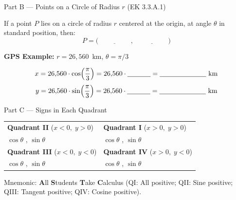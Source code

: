 \documentclass[10pt]{article}
\begin{document}
\vspace{0.08in}

\begin{notesbox}{Part B --- Points on a Circle of Radius $r$ (EK 3.3.A.1)}

If a point $P$ lies on a circle of radius $r$ centered at the origin, at angle $\theta$ in standard position, then:
\[
  P = \bigl(\underline{\hspace{2cm}},\; \underline{\hspace{2cm}}\bigr)
\]

\vspace{0.08in}
\textbf{GPS Example:} $r = 26{,}560$~km, $\theta = \pi/3$

\[
  x = 26{,}560 \cdot \cos\!\left(\frac{\pi}{3}\right) = 26{,}560 \cdot \underline{\hspace{1.2cm}} = \underline{\hspace{2.4cm}} \text{ km}
\]
\[
  y = 26{,}560 \cdot \sin\!\left(\frac{\pi}{3}\right) = 26{,}560 \cdot \underline{\hspace{1.2cm}} = \underline{\hspace{2.4cm}} \text{ km}
\]

\end{notesbox}

\vspace{0.08in}

\begin{notesbox}{Part C --- Signs in Each Quadrant}

\renewcommand{\arraystretch}{1.8}
\begin{tabularx}{\linewidth}{@{} >{\centering\arraybackslash}X | >{\centering\arraybackslash}X @{}}
\textbf{Quadrant II} ($x < 0,\; y > 0$) & \textbf{Quadrant I} ($x > 0,\; y > 0$) \\
$\cos\theta$ \underline{\hspace{0.9cm}}, $\sin\theta$ \underline{\hspace{0.9cm}} &
$\cos\theta$ \underline{\hspace{0.9cm}}, $\sin\theta$ \underline{\hspace{0.9cm}} \\
\hline
\textbf{Quadrant III} ($x < 0,\; y < 0$) & \textbf{Quadrant IV} ($x > 0,\; y < 0$) \\
$\cos\theta$ \underline{\hspace{0.9cm}}, $\sin\theta$ \underline{\hspace{0.9cm}} &
$\cos\theta$ \underline{\hspace{0.9cm}}, $\sin\theta$ \underline{\hspace{0.9cm}} \\
\end{tabularx}
\renewcommand{\arraystretch}{1}

\smallskip
Mnemonic: \textbf{A}ll \textbf{S}tudents \textbf{T}ake \textbf{C}alculus
(QI: All positive; QII: Sine positive; QIII: Tangent positive; QIV: Cosine positive).

\end{notesbox}
\end{document}
